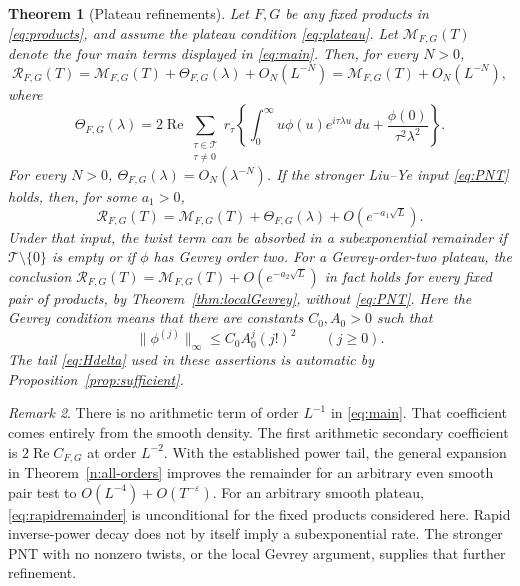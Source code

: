 \documentclass[11pt]{article}
\numberwithin{equation}{section}
\newtheorem{theorem}{Theorem}[section]
\theoremstyle{remark}
\newtheorem{remark}[theorem]{Remark}
\newcommand{\Rea}{\operatorname{Re}}
\begin{document}
\begin{theorem}[Plateau refinements]\label{thm:quantitative}
Let $F,G$ be any fixed products in \eqref{eq:products}, and assume
the plateau condition \eqref{eq:plateau}. Let $\mathcal M_{F,G}(T)$
denote the four main terms displayed in \eqref{eq:main}. Then, for
every $N>0$,
\begin{equation}\label{eq:rapidremainder}
 \mathcal R_{F,G}(T)=\mathcal M_{F,G}(T)
 +\Theta_{F,G}(\lambda)+O_N(L^{-N})
 =\mathcal M_{F,G}(T)+O_N(L^{-N}),
\end{equation}
where
\begin{equation}\label{eq:theta}
 \Theta_{F,G}(\lambda)=2\Rea\sum_{\substack{\tau\in\mathcal T\\\tau\ne0}}
 r_\tau\left\{\int_0^\infty u\phi(u)e^{i\tau\lambda u}\,du
                 +\frac{\phi(0)}{\tau^2\lambda^2}\right\}.
\end{equation}
For every $N>0$, $\Theta_{F,G}(\lambda)=O_N(\lambda^{-N})$.
If the stronger Liu--Ye input \eqref{eq:PNT} holds, then, for some
$a_1>0$,
\begin{equation}\label{eq:quantremainder}
 \mathcal R_{F,G}(T)=\mathcal M_{F,G}(T)
 +\Theta_{F,G}(\lambda)+O\!\left(e^{-a_1\sqrt L}\right).
\end{equation}
Under that input, the twist term can be absorbed in a subexponential
remainder if $\mathcal T\setminus\{0\}$ is empty or if $\phi$ has
Gevrey order two. For a Gevrey-order-two plateau, the conclusion
$\mathcal R_{F,G}(T)=\mathcal M_{F,G}(T)+O(e^{-a_2\sqrt L})$
in fact holds for every fixed pair of products, by
Theorem~\ref{thm:localGevrey}, without \eqref{eq:PNT}.
Here the Gevrey condition means that there are constants $C_0,A_0>0$ such that
\begin{equation}\label{eq:gevrey}
 \|\phi^{(j)}\|_\infty\leq C_0A_0^j(j!)^2\qquad(j\geq0).
\end{equation}
The tail \eqref{eq:Hdelta} used in these assertions is automatic by
Proposition~\ref{prop:sufficient}.
\end{theorem}

\begin{remark}\label{rem:interpretation}
There is no arithmetic term of order $L^{-1}$ in \eqref{eq:main}.
That coefficient comes entirely from the smooth density. The first
arithmetic secondary coefficient is $2\Rea C_{F,G}$ at order $L^{-2}$.
With the established power tail, the general expansion in
Theorem~\ref{n:all-orders} improves the remainder for an arbitrary
even smooth pair test to $O(L^{-4})+O(T^{-\varepsilon})$.
For an arbitrary smooth plateau, \eqref{eq:rapidremainder} is
unconditional for the fixed products considered here. Rapid
inverse-power decay does not by itself imply a subexponential rate.
The stronger PNT with no nonzero twists, or the local Gevrey argument,
supplies that further refinement.
\end{remark}
\end{document}
